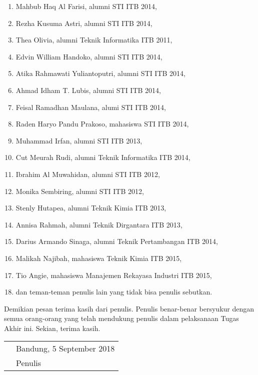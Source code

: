 \begin{enumerate}
    \item Mahbub Haq Al Farisi, alumni STI ITB 2014,
    \item Rezha Kusuma Astri, alumni STI ITB 2014,
    \item Thea Olivia, alumni Teknik Informatika ITB 2011,
    \item Edvin William Handoko, alumni STI ITB 2014,
    \item Atika Rahmawati Yuliantoputri, alumni STI ITB 2014,
    \item Ahmad Idham T. Lubis, alumni STI ITB 2014,
    \item Feisal Ramadhan Maulana, alumi STI ITB 2014,
    \item Raden Haryo Pandu Prakoso, mahasiswa STI ITB 2014,
    \item Muhammad Irfan, alumni STI ITB 2013,
    \item Cut Meurah Rudi, alumni Teknik Informatika ITB 2014,
    \item Ibrahim Al Muwahidan, alumni STI ITB 2012,
    \item Monika Sembiring, alumni STI ITB 2012,
    \item Stenly Hutapea, alumni Teknik Kimia ITB 2013,
    \item Annisa Rahmah, alumni Teknik Dirgantara ITB 2013,
    \item Darius Armando Sinaga, alumni Teknik Pertambangan ITB 2014,
    \item Malikah Najibah, mahasiswa Teknik Kimia ITB 2015,
    \item Tio Angie, mahasiswa Manajemen Rekayasa Industri ITB 2015,
    \item dan teman-teman penulis lain yang tidak bisa penulis sebutkan.
\end{enumerate}

Demikian pesan terima kasih dari penulis. Penulis benar-benar bersyukur dengan semua orang-orang yang telah mendukung penulis dalam pelaksanaan Tugas Akhir ini. Sekian, terima kasih.

\vspace{15mm}
\begin{tabularx}{\textwidth}{l@{\hskip 0.5\textwidth}l}
    & Bandung, 5 September 2018\\
    & Penulis
\end{tabularx}